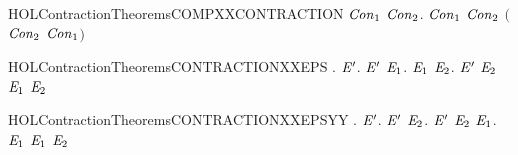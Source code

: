 \newcommand{\HOLContractionTheoremsCOARSESTXXPRECONGRXXTHMYY}{\UseVerbatim{HOLContractionTheoremsCOARSESTXXPRECONGRXXTHMYY}}
\begin{SaveVerbatim}{HOLContractionTheoremsCOMPXXCONTRACTION}
\HOLTokenTurnstile{} \HOLSymConst{\HOLTokenForall{}}\ensuremath{\HOLBoundVar{Con}\sb{\mathrm{1}}} \ensuremath{\HOLBoundVar{Con}\sb{\mathrm{2}}}.
        \ensuremath{\HOLBoundVar{Con}\sb{\mathrm{1}}} \HOLSymConst{\HOLTokenConj{}}  \ensuremath{\HOLBoundVar{Con}\sb{\mathrm{2}}} \HOLSymConst{\HOLTokenImp{}}
        \ensuremath{(}\ensuremath{\HOLBoundVar{Con}\sb{\mathrm{2}}}  \ensuremath{\HOLBoundVar{Con}\sb{\mathrm{1}}}\ensuremath{)}
\end{SaveVerbatim}
\newcommand{\HOLContractionTheoremsCOMPXXCONTRACTION}{\UseVerbatim{HOLContractionTheoremsCOMPXXCONTRACTION}}
\begin{SaveVerbatim}{HOLContractionTheoremsCONTRACTIONXXEPS}
\HOLTokenTurnstile{} \HOLSymConst{\HOLTokenForall{}}.
         \HOLSymConst{\HOLTokenImp{}}
       \HOLSymConst{\HOLTokenForall{}} \ensuremath{\HOLBoundVar{E}\sp{\prime}}.
             \ensuremath{\HOLBoundVar{E}\sp{\prime}} \HOLSymConst{\HOLTokenImp{}} \HOLSymConst{\HOLTokenForall{}}\ensuremath{\HOLBoundVar{E}\sb{\mathrm{1}}}.   \ensuremath{\HOLBoundVar{E}\sb{\mathrm{1}}} \HOLSymConst{\HOLTokenImp{}} \HOLSymConst{\HOLTokenExists{}}\ensuremath{\HOLBoundVar{E}\sb{\mathrm{2}}}.  \ensuremath{\HOLBoundVar{E}\sp{\prime}} \ensuremath{\HOLBoundVar{E}\sb{\mathrm{2}}} \HOLSymConst{\HOLTokenConj{}}  \ensuremath{\HOLBoundVar{E}\sb{\mathrm{1}}} \ensuremath{\HOLBoundVar{E}\sb{\mathrm{2}}}
\end{SaveVerbatim}
\newcommand{\HOLContractionTheoremsCONTRACTIONXXEPS}{\UseVerbatim{HOLContractionTheoremsCONTRACTIONXXEPS}}
\begin{SaveVerbatim}{HOLContractionTheoremsCONTRACTIONXXEPSYY}
\HOLTokenTurnstile{} \HOLSymConst{\HOLTokenForall{}}.
         \HOLSymConst{\HOLTokenImp{}}
       \HOLSymConst{\HOLTokenForall{}} \ensuremath{\HOLBoundVar{E}\sp{\prime}}.
             \ensuremath{\HOLBoundVar{E}\sp{\prime}} \HOLSymConst{\HOLTokenImp{}}
           \HOLSymConst{\HOLTokenForall{}} \ensuremath{\HOLBoundVar{E}\sb{\mathrm{2}}}.  \ensuremath{\HOLBoundVar{E}\sp{\prime}} \ensuremath{\HOLBoundVar{E}\sb{\mathrm{2}}} \HOLSymConst{\HOLTokenImp{}} \HOLSymConst{\HOLTokenExists{}}\ensuremath{\HOLBoundVar{E}\sb{\mathrm{1}}}.   \ensuremath{\HOLBoundVar{E}\sb{\mathrm{1}}} \HOLSymConst{\HOLTokenConj{}}  \ensuremath{\HOLBoundVar{E}\sb{\mathrm{1}}} \ensuremath{\HOLBoundVar{E}\sb{\mathrm{2}}}
\end{SaveVerbatim}
